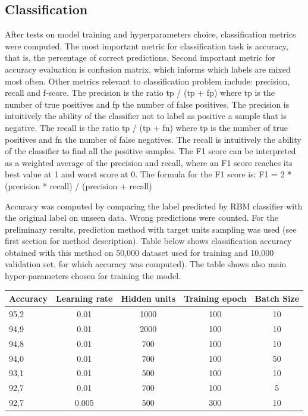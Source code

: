 \documentclass[a4paper]{scrartcl}
\begin{document}
\subsection{Classification}
After tests on model training and hyperparameters choice, classification metrics were computed. The most important metric for classification task is accuracy, that is, the percentage of correct predictions. Second important metric for accuracy evaluation is confusion matrix, which informs which labels are mixed most often. Other metrics relevant to classification problem include: precision, recall and f-score. The precision is the ratio tp / (tp + fp) where tp is the number of true positives and fp the number of false positives. The precision is intuitively the ability of the classifier not to label as positive a sample that is negative. The recall is the ratio tp / (tp + fn) where tp is the number of true positives and fn the number of false negatives. The recall is intuitively the ability of the classifier to find all the positive samples. The F1 score can be interpreted as a weighted average of the precision and recall, where an F1 score reaches its best value at 1 and worst score at 0. The formula for the F1 score is: \newline 
F1 = 2 * (precision * recall) / (precision + recall)
\par Accuracy was computed by comparing the label predicted by RBM classifier with the original label on unseen data. Wrong predictions were counted. For the preliminary results, prediction method with target units sampling was used (see first section for method description). Table below shows classification accuracy obtained with this method on 50,000 dataset used for training and 10,000 validation set, for which accuracy was computed). The table shows also main hyper-parameters chosen for training the model.
\begin{center}
\hspace{1cm}
\begin{tabular}{|l||c|c|c|c|} \hline
Accuracy & Learning rate & Hidden units & Training epoch & Batch Size
\\ \hline
95,2 & 0.01 & 1000 & 100 & 10
\\ \hline
94,9 & 0.01 & 2000 & 100 & 10
\\ \hline
94,8 & 0.01 & 700 & 100 & 10
\\ \hline
94,0 & 0.01 & 700 & 100 & 50
\\ \hline
93,1 & 0.01 & 500 & 100 & 10
\\ \hline
92,7 & 0.01 & 700 & 100 & 5
\\ \hline
92,7 & 0.005 & 500 & 300 & 10
\\ \hline \end{tabular}
\end{center}
\end{document}

